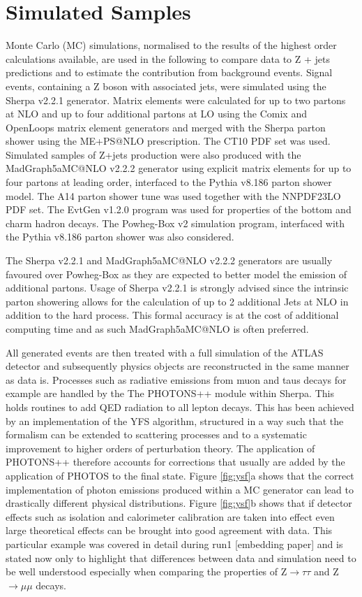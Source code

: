 \section{Simulated Samples}
\label{sec:zmcsamples}

Monte Carlo (MC) simulations, normalised to the results of the highest order calculations available, are used in the following to compare data to Z + jets predictions and to estimate the contribution from background events. Signal events, containing a Z boson with associated jets, were simulated using the Sherpa v2.2.1 generator.  Matrix elements were calculated for up to two partons at NLO and up to four additional partons at LO using the Comix and OpenLoops matrix element generators and merged with the Sherpa parton shower using the ME+PS@NLO prescription. The CT10 PDF set was used. Simulated samples of Z+jets production were also produced with the MadGraph5\textunderscore aMC@NLO v2.2.2 generator using explicit matrix elements for up to four partons at leading order, interfaced to the Pythia v8.186 parton shower model. The A14 parton shower tune was used together with the NNPDF23LO PDF set.  The EvtGen v1.2.0 program was used for properties of the bottom and charm hadron decays. The Powheg-Box v2 simulation program, interfaced with the Pythia v8.186 parton shower was also considered. 

The Sherpa v2.2.1 and MadGraph5\textunderscore aMC@NLO v2.2.2 generators are usually favoured over Powheg-Box as they are expected to better model the emission of additional partons. Usage of Sherpa v2.2.1 is strongly advised since the intrinsic parton showering allows for the calculation of up to 2 additional Jets at NLO in addition to the hard process. This formal accuracy is at the cost of additional computing time and as such MadGraph5\textunderscore aMC@NLO is often preferred. 

All generated events are then treated with a full simulation of the ATLAS detector and subsequently physics objects are reconstructed in the same manner as data is. Processes such as radiative emissions from muon and taus decays for example are handled by the The PHOTONS++ module within Sherpa. This holds routines to add QED radiation to all lepton decays. This has been achieved by an implementation of the YFS algorithm, structured in a way such that the formalism can be extended to scattering processes and to a systematic improvement to higher orders of perturbation theory. The application of PHOTONS++ therefore accounts for corrections that usually are added by the application of PHOTOS to the final state. Figure \ref{fig:ysf}a shows that the correct implementation of photon emissions produced within a MC generator can lead to drastically different physical distributions. Figure \ref{fig:ysf}b shows that if detector effects such as isolation and calorimeter calibration are taken into effect even large theoretical effects can be brought into good agreement with data. This particular example was covered in detail during run1 [embedding paper] and is stated now only to highlight that differences between data and simulation need to be well understood especially when comparing the properties of Z$\rightarrow\tau\tau$ and Z$\rightarrow\mu\mu$ decays. 

